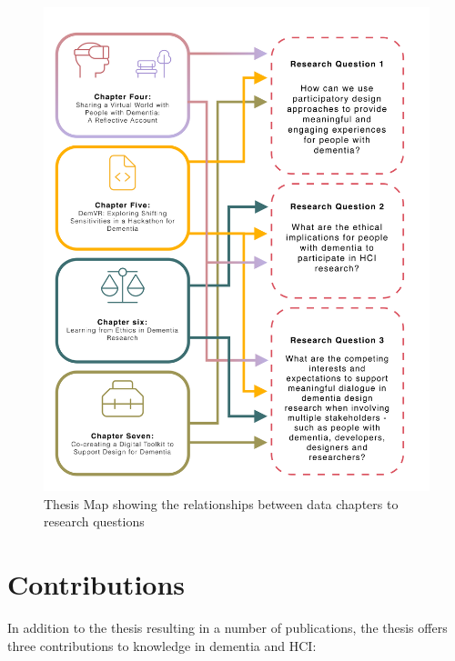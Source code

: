 \label{Intro:Thesis Map}
\begin{figure}[htp]
\centering
\includegraphics[width=.8\linewidth]{Images/Thesis_Narrative/RQ_and_Chapters.png}
\caption{Thesis Map showing the relationships between data chapters to research questions}
\label{fig:RQ_and_Chapters}
\end{figure}


\section{Contributions}
\label{Intro:Contribution}
In addition to the thesis resulting in a number of publications, the thesis offers three contributions to knowledge in dementia and HCI:

